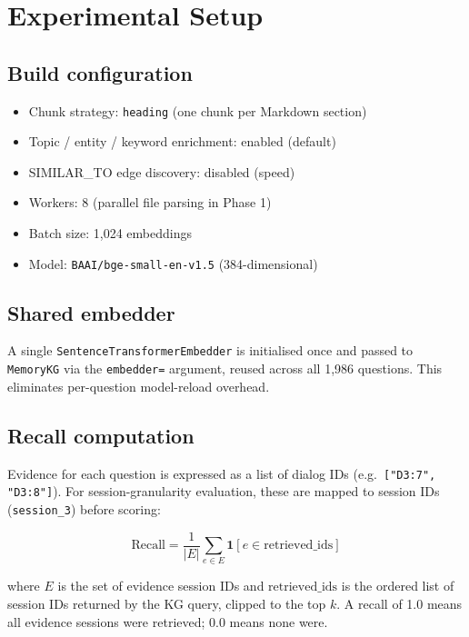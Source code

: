 \documentclass[11pt,a4paper]{article}
\begin{document}
\section{Experimental Setup}
\label{sec:setup}

\subsection{Build configuration}

\begin{itemize}
  \item Chunk strategy: \texttt{heading} (one chunk per Markdown section)
  \item Topic / entity / keyword enrichment: enabled (default)
  \item SIMILAR\_TO edge discovery: disabled (speed)
  \item Workers: 8 (parallel file parsing in Phase 1)
  \item Batch size: 1,024 embeddings
  \item Model: \texttt{BAAI/bge-small-en-v1.5} (384-dimensional)
\end{itemize}

\subsection{Shared embedder}

A single \texttt{SentenceTransformerEmbedder} is initialised once and passed
to \texttt{MemoryKG} via the \texttt{embedder=} argument, reused across all
1,986 questions.
This eliminates per-question model-reload overhead.

\subsection{Recall computation}

Evidence for each question is expressed as a list of dialog IDs
(e.g.\ \texttt{["D3:7", "D3:8"]}).
For session-granularity evaluation, these are mapped to session IDs
(\texttt{session\_3}) before scoring:

\[
  \text{Recall} = \frac{1}{|E|}
    \sum_{e \in E} \mathbf{1}\!\left[e \in \text{retrieved\_ids}\right]
\]

where $E$ is the set of evidence session IDs and
$\text{retrieved\_ids}$ is the ordered list of session IDs returned by the KG
query, clipped to the top $k$.
A recall of 1.0 means all evidence sessions were retrieved; 0.0 means none were.
\end{document}
